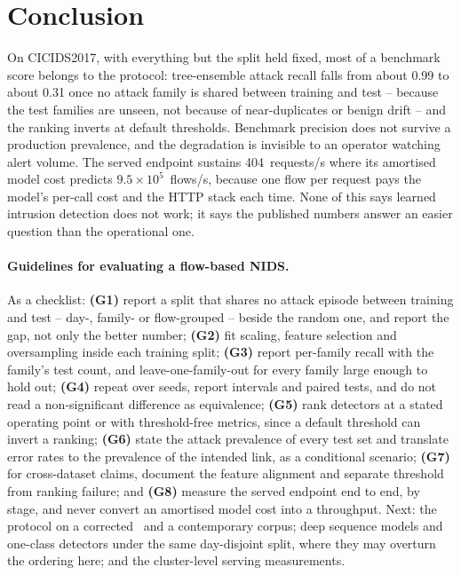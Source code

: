 \documentclass{llncs}
\begin{document}
\section{Conclusion}
\label{sec:conclusion}
On CICIDS2017, with everything but the split held fixed, most of a benchmark
score belongs to the protocol: tree-ensemble attack recall falls from about
0.99 to about 0.31 once no attack family is shared between training and test
-- because the test families are unseen, not because of near-duplicates or
benign drift -- and the ranking inverts at default thresholds. Benchmark
precision does not survive a production prevalence, and the degradation is
invisible to an operator watching alert volume. The served endpoint sustains
404~requests/s where its amortised model cost predicts
$9.5\times10^{5}$~flows/s, because one flow per request pays the model's
per-call cost and the HTTP stack each time. None of this says learned
intrusion detection does not work; it says the published numbers answer an
easier question than the operational one.

\paragraph{Guidelines for evaluating a flow-based NIDS.} As a checklist:
\textbf{(G1)} report a split that shares no attack episode between training
and test -- day-, family- or flow-grouped -- beside the random one, and
report the gap, not only the better number;
\textbf{(G2)} fit scaling, feature selection and oversampling inside each
training split;
\textbf{(G3)} report per-family recall with the family's test count, and
leave-one-family-out for every family large enough to hold out;
\textbf{(G4)} repeat over seeds, report intervals and paired tests, and do
not read a non-significant difference as equivalence;
\textbf{(G5)} rank detectors at a stated operating point or with
threshold-free metrics, since a default threshold can invert a ranking;
\textbf{(G6)} state the attack prevalence of every test set and translate
error rates to the prevalence of the intended link, as a conditional
scenario;
\textbf{(G7)} for cross-dataset claims, document the feature alignment and
separate threshold from ranking failure; and
\textbf{(G8)} measure the served endpoint end to end, by stage, and never
convert an amortised model cost into a throughput.
Next: the protocol on a corrected~\cite{lanvin2023errors} and a contemporary
corpus; deep sequence models and one-class detectors under the same
day-disjoint split, where they may overturn the ordering here; and the
cluster-level serving measurements.
\end{document}
